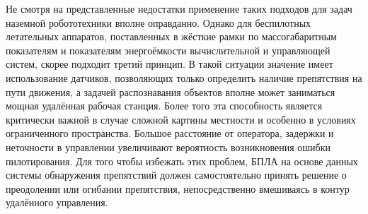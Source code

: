\documentclass[pract, och, master]{SCWorks}
\begin{document}
Не смотря на представленные недостатки применение таких подходов для задач наземной робототехники вполне оправданно. Однако для беспилотных летательных аппаратов,
поставленных в жёсткие рамки по массогабаритным показателям и показателям энергоёмкости вычислительной и управляющей систем, скорее подходит третий принцип. В
такой ситуации значение имеет использование датчиков, позволяющих только определить наличие препятствия на пути движения, а задачей распознавания объектов вполне может
заниматься мощная удалённая рабочая станция. Более того эта способность является критически важной в случае сложной картины местности и особенно в условиях
ограниченного пространства. Большое расстояние от оператора, задержки и неточности в управлении увеличивают вероятность возникновения ошибки пилотирования. Для того
чтобы избежать этих проблем, БПЛА на основе данных системы обнаружения препятствий должен самостоятельно принять решение о преодолении или огибании препятствия,
непосредственно вмешиваясь в контур удалённого управления.







\end{document}
